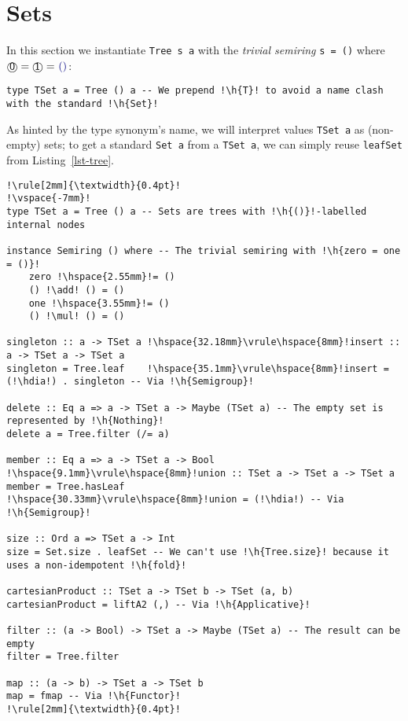 \documentclass[crc,english]{programming}
\newcommand{\code}[1]{\lstinline[mathescape]|#1|}
\newcommand{\hcode}[1]{{\color{darkblue} \lstinline[keywordstyle={}]|#1|}} %
\newcommand{\h}[1]{{\itshape\color{grayblue}#1}} %
\newcommand{\hdia}{\,\text{\raisebox{-0.2mm}{\Large\color{darkblue} $\diamond$}}\,}
\newcommand{\add}{\text{\raisebox{-0.1mm}{\large $\oplus$}}}
\newcommand{\mul}{\text{\raisebox{-0.1mm}{\large $\otimes$}}}
\newcommand{\zero}{\raisebox{-0.2mm}{\textcircled{\textsf{0}}}\xspace}
\newcommand{\one}{\raisebox{-0.2mm}{\textcircled{\textsf{\hspace{-0.2mm}1}}}\xspace}
\begin{document}
\section{Sets}\label{sec-set}

In this section we instantiate \hcode{Tree s a} with the \emph{trivial semiring}
\hcode{s = ()} where $\zero = \one = \text{\hcode{()}}$:

\begin{lstlisting}
type TSet a = Tree () a -- We prepend !\h{T}! to avoid a name clash with the standard !\h{Set}!
\end{lstlisting}

\noindent
As hinted by the type synonym's name, we will interpret values \hcode{TSet a} as
(non-empty) sets; to get a standard \hcode{Set a} from a \hcode{TSet a}, we can
simply reuse \hcode{leafSet} from Listing~\ref{lst-tree}.

\begin{lstlisting}[label=lst-set,xleftmargin=0pt,belowskip=7pt,caption={
    Implementing a part of the standard \code{Data.S}\code{et} API with
    \hcode{TSet}.
}]
!\rule[2mm]{\textwidth}{0.4pt}!
!\vspace{-7mm}!
type TSet a = Tree () a -- Sets are trees with !\h{()}!-labelled internal nodes

instance Semiring () where -- The trivial semiring with !\h{zero = one = ()}!
    zero !\hspace{2.55mm}!= ()
    () !\add! () = ()
    one !\hspace{3.55mm}!= ()
    () !\mul! () = ()

singleton :: a -> TSet a !\hspace{32.18mm}\vrule\hspace{8mm}!insert :: a -> TSet a -> TSet a
singleton = Tree.leaf    !\hspace{35.1mm}\vrule\hspace{8mm}!insert = (!\hdia!) . singleton -- Via !\h{Semigroup}!

delete :: Eq a => a -> TSet a -> Maybe (TSet a) -- The empty set is represented by !\h{Nothing}!
delete a = Tree.filter (/= a)

member :: Eq a => a -> TSet a -> Bool !\hspace{9.1mm}\vrule\hspace{8mm}!union :: TSet a -> TSet a -> TSet a
member = Tree.hasLeaf                 !\hspace{30.33mm}\vrule\hspace{8mm}!union = (!\hdia!) -- Via !\h{Semigroup}!

size :: Ord a => TSet a -> Int
size = Set.size . leafSet -- We can't use !\h{Tree.size}! because it uses a non-idempotent !\h{fold}!

cartesianProduct :: TSet a -> TSet b -> TSet (a, b)
cartesianProduct = liftA2 (,) -- Via !\h{Applicative}!

filter :: (a -> Bool) -> TSet a -> Maybe (TSet a) -- The result can be empty
filter = Tree.filter

map :: (a -> b) -> TSet a -> TSet b
map = fmap -- Via !\h{Functor}!
!\rule[2mm]{\textwidth}{0.4pt}!
\end{lstlisting}
\end{document}
